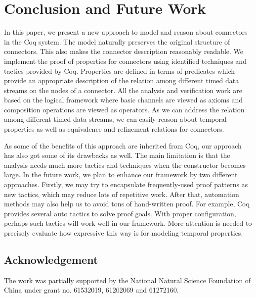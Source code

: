 \documentclass[3p,times]{elsarticle}
\begin{document}
\section{Conclusion and Future Work}\label{sec:conclusion}
In this paper, we present a new approach to model and reason about connectors in the Coq system. The model naturally
preserves the original structure of connectors. This also makes the connector description reasonably readable. We
implement the proof of properties for connectors using identified techniques and tactics provided by Coq. Properties are
defined in terms of predicates which provide an appropriate description of the relation among different
timed data streams on the nodes of a connector. All the analysis and verification work are based on the logical framework
where basic channels are viewed as axioms and composition operations are viewed as operators. As we can address
the relation among different timed data streams, we can easily reason about temporal properties as well as equivalence
and refinement relations for connectors.

As some of the benefits of this approach are inherited from Coq, our approach has also got some of its drawbacks as well.
The main limitation is that the analysis needs much more tactics and techniques when the constructor becomes large.
In the future work, we plan to enhance our framework by two different approaches. Firstly, we may try to encapsulate
frequently-used proof patterns as new tactics, which may reduce lots of repetitive work. After that, automation methods
may also help us to avoid tons of hand-written proof. For example, Coq provides several auto tactics to solve proof
goals. With proper configuration, perhaps such tactics will work well in our framework. More attention is needed to precisely
evaluate how expressive this way is for modeling temporal properties.

\subsection*{Acknowledgement}
\noindent The work was partially supported by the National Natural Science Foundation of China under grant no. 61532019, 61202069 and 61272160.



\end{document}
